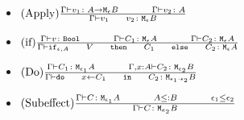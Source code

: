 \documentclass{report}
\begin{document}
\begin{itemize}
\begin{itemize}
            \item $\treerule{Apply}{\typerelation{\G}{v_1}{\lamtype{A}{\e}{B}}\s\s\typerelation{\G}{v_2}{A}}{\typerelation{\G}{\apply{v_1}{v_2}}{\M{\e}{B}}}$
            \item $\treerule{if}{\typerelation{\G}{v}{\B} \s\s \typerelation{\G}{C_1}{\M{\e}{A}}\s\s\typerelation{\G}{C_2}{\M{\e}{A}}}{\typerelation{\G}{\ifthenelse{\e}{A}{V}{C_1}{C_2}}{\M{\e}{A}}}$
            \item $\treerule{Do}{\typerelation{\G}{C_1}{\M{\e_1}{A}} \s\s \typerelation{\G, x: A}{C_2}{\M{\e_2}{B}}}{\typerelation{\G}{\doin{x}{C_1}{C_2}}{\M{\e_1 \cdot \e_2}{B}}}$
            \item $\treerule{Subeffect}{\typerelation{\G}{C}{\M{\e_1}{A}}\s\s A \subtype B \s\s \e_1 \subeffect \e_2}{\typerelation{\G}{C}{\M{e_2}{B}}}$

        \end{itemize}
    \end{itemize}
\end{document}
